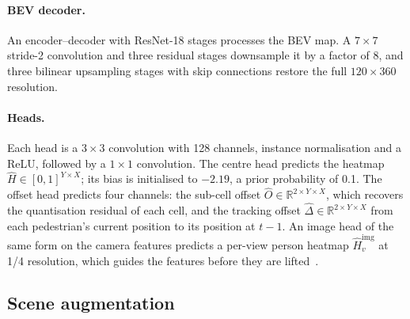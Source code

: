 \documentclass[10pt,twocolumn,letterpaper]{article}
\newcommand{\R}{\mathbb{R}}
\newcommand{\Hhat}{\hat{H}}
\newcommand{\Ohat}{\hat{O}}
\newcommand{\Dhat}{\hat{\Delta}}
\begin{document}
\paragraph{BEV decoder.} An encoder--decoder with ResNet-18 stages processes the BEV map. A $7 \times 7$ stride-2
convolution and three residual stages downsample it by a factor of 8, and three bilinear upsampling stages with skip
connections restore the full $120 \times 360$ resolution.

\paragraph{Heads.} Each head is a $3 \times 3$ convolution with 128 channels, instance normalisation and a ReLU,
followed by a $1 \times 1$ convolution. The centre head predicts the heatmap $\Hhat \in [0,1]^{Y \times X}$; its bias
is initialised to $-2.19$, a prior probability of 0.1. The offset head predicts four channels: the sub-cell offset
$\Ohat \in \R^{2 \times Y \times X}$, which recovers the quantisation residual of each cell, and the tracking offset
$\Dhat \in \R^{2 \times Y \times X}$ from each pedestrian's current position to its position at $t-1$. An image head
of the same form on the camera features predicts a per-view person heatmap $\Hhat^{\mathrm{img}}_v$ at 1/4
resolution, which guides the features before they are lifted~\cite{teepe2024lifting}.

\subsection{Scene augmentation}
\label{sec:sa}
\end{document}
